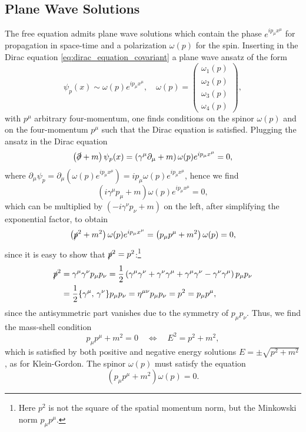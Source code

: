 \subsection{Plane Wave Solutions}

The free equation admits plane wave solutions which contain the phase \(e^{ip_\mu x^{\mu}}\) for propagation in space-time and a polarization \(\omega(p)\) for the spin. Inserting in the Dirac equation \eqref{eq:dirac_equation_covariant} a plane wave ansatz of the form
\[
    \psi_p (x) \sim \omega(p) e^{i p_\mu x^{\mu}}, \quad \omega(p) = \begin{pmatrix}
        \omega_1(p) \\
        \omega_2(p) \\
        \omega_3(p) \\
        \omega_4(p)
    \end{pmatrix},
\]
with \(p^{\mu}\) arbitrary four-momentum, one finds conditions on the spinor \(\omega(p)\) and on the four-momentum \(p^{\mu}\) such that the Dirac equation is satisfied. Plugging the ansatz in the Dirac equation
\[
    \left(\slashed{\partial} + m\right)\psi_p (x) = \left(\gamma^{\mu} \partial_{\mu} + m \right) \omega(p) e^{i p_\mu x^{\mu}} = 0,
\]
where \(\partial_{\mu} \psi_p = \partial_\mu \left(\omega(p) e^{i p_\mu x^{\mu}}\right) = i p_\mu \omega(p) e^{i p_\mu x^{\mu}}\), hence we find
\[
    \left(i \gamma^{\mu} p_{\mu} + m \right) \omega(p) e^{i p_\mu x^{\mu}} = 0,
\]
which can be multiplied by \(\left(-i \gamma^{\nu} p_{\nu} + m \right)\) on the left, after simplifying the exponential factor, to obtain
\[
    \left(\slashed{p}^2 + m^2 \right) \omega(p) e^{i p_\mu x^{\mu}} = \left(p_{\mu} p^{\mu} + m^2 \right) \omega(p) = 0,
\]
since it is easy to show that \(\slashed{p}^2 = p^2\):\footnote{Here \(p^2\) is not the square of the spatial momentum norm, but the Minkowski norm \(p_{\mu} p^{\mu}\).}
\[
    \begin{aligned}
        \slashed{p}^2 & = \gamma^{\mu} \gamma^{\nu} p_{\mu} p_{\nu} = \frac{1}{2} \left(\gamma^{\mu} \gamma^{\nu} + \gamma^{\nu} \gamma^{\mu} + \gamma^{\mu} \gamma^{\nu} - \gamma^{\nu} \gamma^{\mu}\right) p_{\mu} p_{\nu} \\
                      & = \frac{1}{2} \{\gamma^{\mu},\,\gamma^{\nu}\} p_{\mu} p_{\nu} = \eta^{\mu \nu} p_{\mu} p_{\nu} = p^2 = p_{\mu} p^{\mu},
    \end{aligned}
\]
since the antisymmetric part vanishes due to the symmetry of \(p_{\mu} p_{\nu}\). Thus, we find the mass-shell condition
\[
    p_{\mu} p^{\mu} + m^2 = 0 \quad \Longleftrightarrow \quad E^2 = p^2 + m^2,
\]
which is satisfied by both positive and negative energy solutions \(E = \pm \sqrt{p^2 + m^2}\), as for Klein-Gordon. The spinor \(\omega(p)\) must satisfy the equation
\begin{equation}
    \left(p_{\mu}p^{\mu} + m^2 \right) \omega(p) = 0.
    \label{eq:dirac_spinor_equation}
\end{equation}

